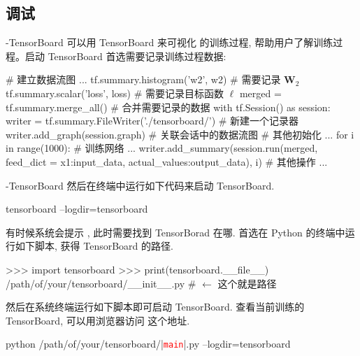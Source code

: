 \subsection{调试}
\begin{frame}[fragile]{\insertsection}{\insertsubsection-TensorBoard}
可以用 TensorBoard 来可视化 \tensorflow{} 的训练过程, 帮助用户了解训练过程。启动 TensorBoard 首选需要记录训练过程数据:

\begin{pythoncode}[fontsize = \fontsize{8}{8}\selectfont]
# 建立数据流图 ...
tf.summary.histogram('w2', w2) # 需要记录 $\bm{W}_2$
tf.summary.scalar('loss', loss) # 需要记录目标函数 $\ell$
merged = tf.summary.merge_all() # 合并需要记录的数据
with tf.Session() as session:
  writer = tf.summary.FileWriter('./tensorboard/') # 新建一个记录器
  writer.add_graph(session.graph) # 关联会话中的数据流图
  # 其他初始化 ...
  for i in range(1000):
    # 训练网络 ...
    writer.add_summary(session.run(merged, feed_dict = {x1:input_data, actual_values:output_data}), i)
    # 其他操作 ...
\end{pythoncode}
\end{frame}

\begin{frame}[fragile]{\insertsection}{\insertsubsection-TensorBoard}
然后在终端中运行如下代码来启动 TensorBoard.
\begin{shellcode}[fontsize = \fontsize{8}{8}\selectfont]
tensorboard --logdir=tensorboard
\end{shellcode}
\pause

\vspace{-5pt}%
有时候系统会提示 , 此时需要找到 TensorBorad 在哪. 首选在 Python 的终端中运行如下脚本, 获得 TensorBoard 的路径.%
\begin{pythoncode}[fontsize = \fontsize{8}{8}\selectfont]
>>> import tensorboard
>>> print(tensorboard.__file__)
/path/of/your/tensorboard/__init__.py # $\leftarrow$ 这个就是路径
\end{pythoncode}
\pause

\vspace{-5pt}%
然后在系统终端运行如下脚本即可启动 TensorBoard. 查看当前训练的 TensorBoard, 可以用浏览器访问  这个地址.
\begin{shellcode}[fontsize = \fontsize{8}{8}\selectfont]
python /path/of/your/tensorboard/|\texttt{\textcolor{red}{main}}|.py --logdir=tensorboard
\end{shellcode}
\end{frame}

